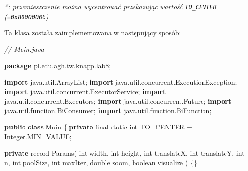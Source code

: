 \documentclass[11pt]{article}
\newenvironment{Shaded}{}{}
\newcommand{\KeywordTok}[1]{\textcolor[rgb]{0.00,0.44,0.13}{\textbf{{#1}}}}
\newcommand{\DataTypeTok}[1]{\textcolor[rgb]{0.56,0.13,0.00}{{#1}}}
\newcommand{\CommentTok}[1]{\textcolor[rgb]{0.38,0.63,0.69}{\textit{{#1}}}}
\newcommand{\FunctionTok}[1]{\textcolor[rgb]{0.02,0.16,0.49}{{#1}}}
\newcommand{\NormalTok}[1]{{#1}}
\newcommand{\ImportTok}[1]{{#1}}
\newcommand{\OperatorTok}[1]{\textcolor[rgb]{0.40,0.40,0.40}{{#1}}}
\newcommand{\BuiltInTok}[1]{{#1}}
\begin{document}
\emph{*: przemieszczenie można wycentrować przekazując wartość
\texttt{TO\_CENTER} (\texttt{=0x80000000})}

Ta klasa została zaimplementowana w następujący sposób:

\begin{Shaded}
\begin{Highlighting}[]
\CommentTok{// Main.java}

\KeywordTok{package}\ImportTok{ pl}\OperatorTok{.}\ImportTok{edu}\OperatorTok{.}\ImportTok{agh}\OperatorTok{.}\ImportTok{tw}\OperatorTok{.}\ImportTok{knapp}\OperatorTok{.}\ImportTok{lab8}\OperatorTok{;}

\KeywordTok{import} \ImportTok{java}\OperatorTok{.}\ImportTok{util}\OperatorTok{.}\ImportTok{ArrayList}\OperatorTok{;}
\KeywordTok{import} \ImportTok{java}\OperatorTok{.}\ImportTok{util}\OperatorTok{.}\ImportTok{concurrent}\OperatorTok{.}\ImportTok{ExecutionException}\OperatorTok{;}
\KeywordTok{import} \ImportTok{java}\OperatorTok{.}\ImportTok{util}\OperatorTok{.}\ImportTok{concurrent}\OperatorTok{.}\ImportTok{ExecutorService}\OperatorTok{;}
\KeywordTok{import} \ImportTok{java}\OperatorTok{.}\ImportTok{util}\OperatorTok{.}\ImportTok{concurrent}\OperatorTok{.}\ImportTok{Executors}\OperatorTok{;}
\KeywordTok{import} \ImportTok{java}\OperatorTok{.}\ImportTok{util}\OperatorTok{.}\ImportTok{concurrent}\OperatorTok{.}\ImportTok{Future}\OperatorTok{;}
\KeywordTok{import} \ImportTok{java}\OperatorTok{.}\ImportTok{util}\OperatorTok{.}\ImportTok{function}\OperatorTok{.}\ImportTok{BiConsumer}\OperatorTok{;}
\KeywordTok{import} \ImportTok{java}\OperatorTok{.}\ImportTok{util}\OperatorTok{.}\ImportTok{function}\OperatorTok{.}\ImportTok{BiFunction}\OperatorTok{;}

\KeywordTok{public} \KeywordTok{class}\NormalTok{ Main }\OperatorTok{\{}
    \KeywordTok{private} \DataTypeTok{final} \DataTypeTok{static} \DataTypeTok{int}\NormalTok{ TO\_CENTER }\OperatorTok{=} \BuiltInTok{Integer}\OperatorTok{.}\FunctionTok{MIN\_VALUE}\OperatorTok{;}

    \KeywordTok{private}\NormalTok{ record }\FunctionTok{Params}\OperatorTok{(}
            \DataTypeTok{int}\NormalTok{ width}\OperatorTok{,}
            \DataTypeTok{int}\NormalTok{ height}\OperatorTok{,}
            \DataTypeTok{int}\NormalTok{ translateX}\OperatorTok{,}
            \DataTypeTok{int}\NormalTok{ translateY}\OperatorTok{,}
            \DataTypeTok{int}\NormalTok{ n}\OperatorTok{,}
            \DataTypeTok{int}\NormalTok{ poolSize}\OperatorTok{,}
            \DataTypeTok{int}\NormalTok{ maxIter}\OperatorTok{,}
            \DataTypeTok{double}\NormalTok{ zoom}\OperatorTok{,}
            \DataTypeTok{boolean}\NormalTok{ visualize}
    \OperatorTok{)} \OperatorTok{\{\}}


\end{Highlighting}
\end{Shaded}
\end{document}
